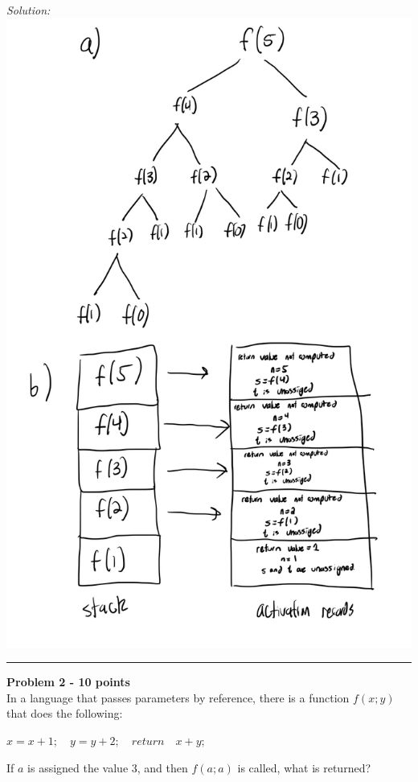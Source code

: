 \documentclass[a4paper, 11pt]{article}
\newenvironment{problem}[2][Problem]
    { \begin{mdframed}[backgroundcolor=gray!20] \textbf{#1 #2} \\}
    {  \end{mdframed}}
\newenvironment{solution}
    {\textit{Solution:}}
    {}
\begin{document}
\begin{solution}
    \includegraphics[scale=.4]{Prob1.jpeg}
\end{solution} 

\noindent\rule{7in}{2.8pt}


\begin{problem}{2 - 10 points}
In a language that passes parameters by reference, there is a  function $f(x;y)$ that does the following:  

$x = x + 1;\quad y = y + 2; \quad return \quad x+y;$  

\noindent If $a$ is assigned the value 3, and then $f(a;a)$ is called, what is returned? 
\end{problem}
\end{document}

